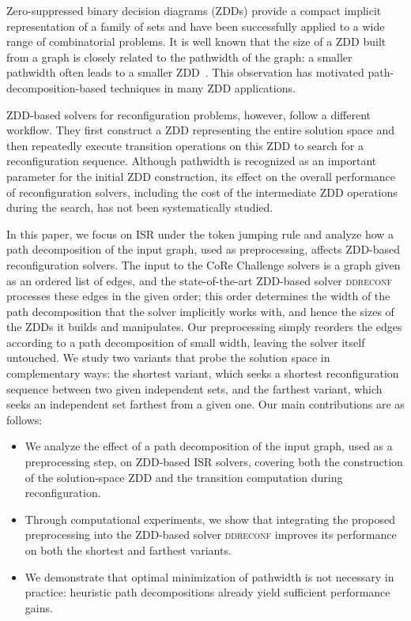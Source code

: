 \documentclass[conference]{IEEEtran}
\begin{document}
Zero-suppressed binary decision diagrams (ZDDs) provide a compact implicit
representation of a family of sets and have been successfully applied to a wide
range of combinatorial problems.
It is well known that the size of a ZDD built from a graph is closely related to
the pathwidth of the graph: a smaller pathwidth often leads to a smaller
ZDD~\cite{inoue16}.
This observation has motivated path-decomposition-based techniques in many ZDD
applications.

ZDD-based solvers for reconfiguration problems, however, follow a different
workflow.
They first construct a ZDD representing the entire solution space and then
repeatedly execute transition operations on this ZDD to search for a
reconfiguration sequence.
Although pathwidth is recognized as an important parameter for the initial ZDD
construction, its effect on the overall performance of reconfiguration solvers,
including the cost of the intermediate ZDD operations during the search, has not
been systematically studied.

In this paper, we focus on ISR under the token jumping rule and analyze how a
path decomposition of the input graph, used as preprocessing, affects ZDD-based
reconfiguration solvers.
The input to the CoRe Challenge solvers is a graph given as an ordered list of
edges, and the state-of-the-art ZDD-based solver \textsc{ddreconf} processes
these edges in the given order; this order determines the width of the path
decomposition that the solver implicitly works with, and hence the sizes of the
ZDDs it builds and manipulates.
Our preprocessing simply reorders the edges according to a path decomposition of
small width, leaving the solver itself untouched.
We study two variants that probe the solution space in complementary ways: the
shortest variant, which seeks a shortest reconfiguration sequence between two
given independent sets, and the farthest variant, which seeks an independent set
farthest from a given one.
Our main contributions are as follows:
\begin{itemize}
\item We analyze the effect of a path decomposition of the input graph, used as a
preprocessing step, on ZDD-based ISR solvers, covering both the construction of
the solution-space ZDD and the transition computation during reconfiguration.
\item Through computational experiments, we show that integrating the proposed
preprocessing into the ZDD-based solver \textsc{ddreconf} improves its
performance on both the shortest and farthest variants.
\item We demonstrate that optimal minimization of pathwidth is not necessary in
practice: heuristic path decompositions already yield sufficient performance
gains.
\end{itemize}
\end{document}
